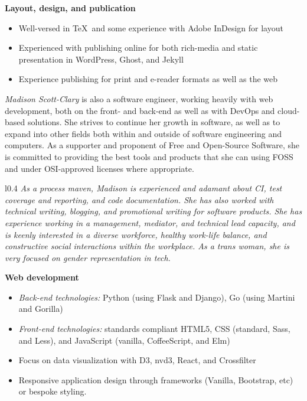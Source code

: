 \documentclass[letterpaper]{memoir}
\begin{document}
\hspace{-1.5em}\textbf{Layout, design, and publication}

\begin{itemize}
  \item Well-versed in \TeX\ and some experience with Adobe InDesign for layout
  \item Experienced with publishing online for both rich-media and static presentation in WordPress, Ghost, and Jekyll
  \item Experience publishing for print and e-reader formats as well as the web
\end{itemize}

\newpage

\noindent\textit{\large Madison Scott-Clary} is also a software engineer, working heavily with web development, both on the front- and back-end as well as with DevOps and cloud-based solutions. She strives to continue her growth in software, as well as to expand into other fields both within and outside of software engineering and computers. As a supporter and proponent of Free and Open-Source Software, she is committed to providing the best tools and products that she can using FOSS and under OSI-approved licenses where appropriate.

\begin{wrapfigure}{l}{0.4\linewidth}
  \textit{\color{titlegreydark} \large As a process maven, Madison is experienced and adamant about CI, test coverage and reporting, and code documentation. She has also worked with technical writing, blogging, and promotional writing for software products. She has experience working in a management, mediator, and technical lead capacity, and is keenly interested in a diverse workforce, healthy work-life balance, and constructive social interactions within the workplace. As a trans woman, she is very focused on gender representation in tech.}
  \vspace{-0.7in}
\end{wrapfigure}

\textbf{Web development}

\begin{itemize}
  \item \textit{Back-end technologies:} Python (using Flask and Django), Go (using Martini and Gorilla)
  \item \textit{Front-end technologies:} standards compliant HTML5, CSS (standard, Sass, and Less), and JavaScript (vanilla, CoffeeScript, and Elm)
  \item Focus on data visualization with D3, nvd3, React, and Crossfilter
  \item Responsive application design through frameworks (Vanilla, Bootstrap, etc) or bespoke styling.
\end{itemize}
\end{document}
